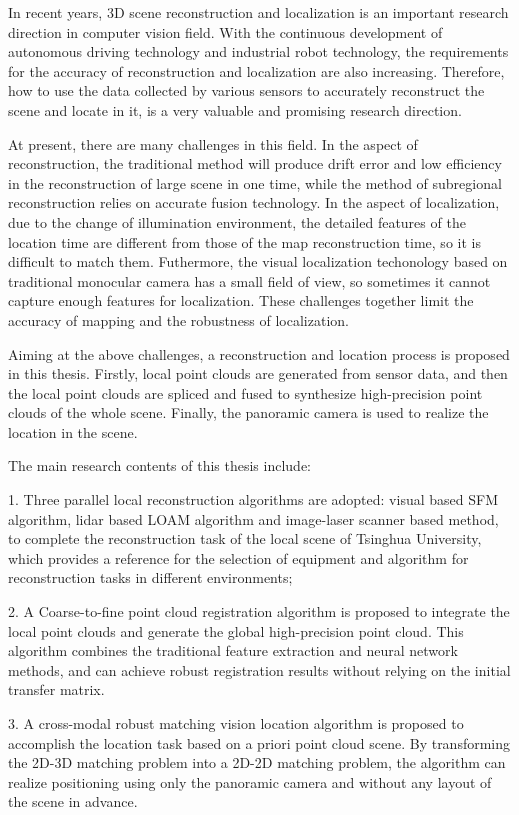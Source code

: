 \begin{abstract*}
	In recent years, 3D scene reconstruction and localization is an important research direction in computer vision field. With the continuous development of autonomous driving technology and industrial robot technology, the requirements for the accuracy of reconstruction and localization are also increasing. Therefore, how to use the data collected by various sensors to accurately reconstruct the scene and locate in it, is a very valuable and promising research direction.
	
	At present, there are many challenges in this field. In the aspect of reconstruction, the traditional method will produce drift error and low efficiency in the reconstruction of large scene in one time, while the method of subregional reconstruction relies on accurate fusion technology. In the aspect of localization, due to the change of illumination environment, the detailed features of the location time are different from those of the map reconstruction time, so it is difficult to match them. Futhermore, the visual localization techonology based on traditional monocular camera has a small field of view, so sometimes it cannot capture enough features for localization. These challenges together limit the accuracy of mapping and the robustness of localization.
	
	Aiming at the above challenges, a reconstruction and location process is proposed in this thesis. Firstly, local point clouds are generated from sensor data, and then the local point clouds are spliced and fused to synthesize high-precision point clouds of the whole scene. Finally, the panoramic camera is used to realize the location in the scene.
	
	The main research contents of this thesis include:
	
	1. Three parallel local reconstruction algorithms are adopted: visual based SFM algorithm, lidar based LOAM algorithm and image-laser scanner based method, to complete the reconstruction task of the local scene of Tsinghua University, which provides a reference for the selection of equipment and algorithm for reconstruction tasks in different environments;
	
	2. A Coarse-to-fine point cloud registration algorithm is proposed to integrate the local point clouds and generate the global high-precision point cloud. This algorithm combines the traditional feature extraction and neural network methods, and can achieve robust registration results without relying on the initial transfer matrix.
	
	3. A cross-modal robust matching vision location algorithm is proposed to accomplish the location task based on a priori point cloud scene. By transforming the 2D-3D matching problem into a 2D-2D matching problem, the algorithm can realize positioning using only the panoramic camera and without any layout of the scene in advance.
	
\end{abstract*}
